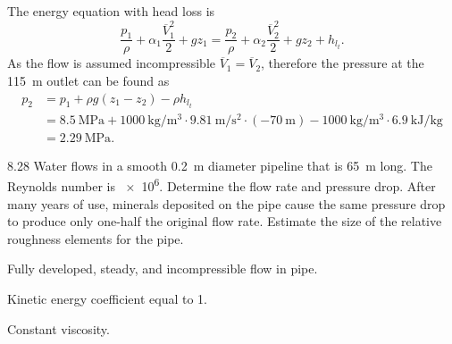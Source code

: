 \begin{derivation}
  The energy equation with head loss is
  \[ 
  \frac{p_1}{\rho} + \alpha_1 \frac{\overline{V}_1^2}{2} + gz_1 = \frac{p_2}{\rho} + \alpha_2 \frac{\overline{V}_2^2}{2} + gz_2 + h_{l_t}
  .\]
  As the flow is assumed incompressible $\overline{V}_1 = \overline{V}_2$, therefore the pressure at the \qty{115}{\m} outlet can be found as
  \begin{align*}
    p_2 &= p_1 + \rho g \left( z_1 - z_2 \right) - \rho h_{l_t} \\
    &= \qty{8,5}{\MPa} + \qty{1000}{\kg\per\cubic\m} \cdot \qty{9,81}{\m\per\square\s} \cdot \left( \qty{-70}{\m}  \right) - \qty{1000}{\kg\per\cubic\m} \cdot \qty{6,9}{\kJ\per\kg}  \\
    &=  \qty{2,29}{\MPa} 
  .\end{align*}
\end{derivation}


\begin{problem}{8.28}
  Water flows in a smooth \qty{0,2}{\m} diameter pipeline that is \qty{65}{\m} long.
  The Reynolds number is \num{e6}.
  Determine the flow rate and pressure drop.
  After many years of use, minerals deposited on the pipe cause the same pressure drop to produce only one-half the original flow rate.
  Estimate the size of the relative roughness elements for the pipe.
\end{problem}

\begin{assumptions}
  \item Fully developed, steady, and incompressible flow in pipe.
  \item Kinetic energy coefficient equal to 1.
  \item Constant viscosity.
\end{assumptions}

